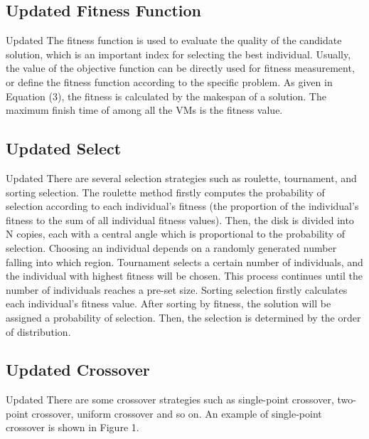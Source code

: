 \documentclass[conference]{IEEEtran}%
\begin{document}
%
\subsection{Updated Fitness Function}%
\label{subsec:UpdatedFitnessFunction}%
Updated The fitness function is used to evaluate the quality of the candidate solution, which is an important index for selecting the best individual. Usually, the value of the objective function can be directly used for fitness measurement, or define the fitness function according to the specific problem. As given in Equation (3), the fitness is calculated by the makespan of a solution. The maximum finish time of among all the VMs is the fitness value.

%
\subsection{Updated Select}%
\label{subsec:UpdatedSelect}%
Updated There are several selection strategies such as roulette, tournament, and sorting selection. The roulette method firstly computes the probability of selection according to each individual’s fitness (the proportion of the individual’s fitness to the sum of all individual fitness values). Then, the disk is divided into N copies, each with a central angle which is proportional to the probability of selection. Choosing an individual depends on a randomly generated number falling into which region. Tournament selects a certain number of individuals, and the individual with highest fitness will be chosen. This process continues until the number of individuals reaches a pre-set size. Sorting selection firstly calculates each individual’s fitness value. After sorting by fitness, the solution will be assigned a probability of selection. Then, the selection is determined by the order of distribution.

%
\subsection{Updated Crossover}%
\label{subsec:UpdatedCrossover}%
Updated There are some crossover strategies such as single-point crossover, two-point crossover, uniform crossover and so on. An example of single-point crossover is shown in Figure 1.

%
%
%
\end{document}

